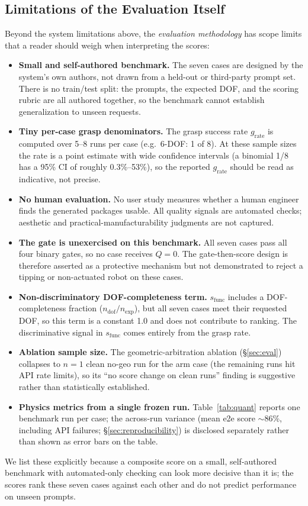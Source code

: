 \documentclass[conference]{IEEEtran}
\begin{document}
\subsection{Limitations of the Evaluation Itself}
\label{sec:eval-limits}
Beyond the system limitations above, the \emph{evaluation methodology} has scope limits that a reader should weigh when interpreting the scores:
\begin{itemize}
    \item \textbf{Small and self-authored benchmark.} The seven cases are designed by the system's own authors, not drawn from a held-out or third-party prompt set. There is no train/test split: the prompts, the expected DOF, and the scoring rubric are all authored together, so the benchmark cannot establish generalization to unseen requests.
    \item \textbf{Tiny per-case grasp denominators.} The grasp success rate $g_{\text{rate}}$ is computed over 5--8 runs per case (e.g.\ 6-DOF: 1 of 8). At these sample sizes the rate is a point estimate with wide confidence intervals (a binomial 1/8 has a 95\% CI of roughly 0.3\%--53\%), so the reported $g_{\text{rate}}$ should be read as indicative, not precise.
    \item \textbf{No human evaluation.} No user study measures whether a human engineer finds the generated packages usable. All quality signals are automated checks; aesthetic and practical-manufacturability judgments are not captured.
    \item \textbf{The gate is unexercised on this benchmark.} All seven cases pass all four binary gates, so no case receives $Q=0$. The gate-then-score design is therefore asserted as a protective mechanism but not demonstrated to reject a tipping or non-actuated robot on these cases.
    \item \textbf{Non-discriminatory DOF-completeness term.} $s_{\text{func}}$ includes a DOF-completeness fraction ($n_{\text{dof}}/n_{\text{exp}}$), but all seven cases meet their requested DOF, so this term is a constant 1.0 and does not contribute to ranking. The discriminative signal in $s_{\text{func}}$ comes entirely from the grasp rate.
    \item \textbf{Ablation sample size.} The geometric-arbitration ablation (\S\ref{sec:eval}) collapses to $n=1$ clean no-geo run for the arm case (the remaining runs hit API rate limits), so its ``no score change on clean runs'' finding is suggestive rather than statistically established.
    \item \textbf{Physics metrics from a single frozen run.} Table~\ref{tab:quant} reports one benchmark run per case; the across-run variance (mean e2e score $\sim$86\%, including API failures; \S\ref{sec:reproducibility}) is disclosed separately rather than shown as error bars on the table.
\end{itemize}
We list these explicitly because a composite score on a small, self-authored benchmark with automated-only checking can look more decisive than it is; the scores rank these seven cases against each other and do not predict performance on unseen prompts.
\end{document}
